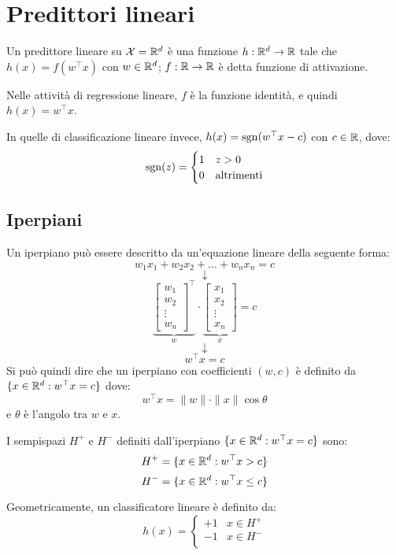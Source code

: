 \section{Predittori lineari}
Un predittore lineare su $\mathcal{X}=\mathbb{R}^d$ è una funzione $h:\mathbb{R}^d\rightarrow\mathbb{R}$
tale che $h(x)=f(w^\top x)$ con $w\in\mathbb{R}^d$; $f:\mathbb{R}\rightarrow\mathbb{R}$ è
detta funzione di attivazione. 

Nelle attività di regressione lineare, $f$ è la funzione identità, e quindi
$h(x)=w^\top x$.

In quelle di classificazione lineare invece, $h(x)=\operatorname*{sgn}(w^\top x-c)$ con
$c\in\mathbb{R}$, dove:
$$ \operatorname*{sgn}(z) = \begin{cases}1&z>0\\0&\text{altrimenti}\end{cases} $$

\subsection{Iperpiani}
Un iperpiano può essere descritto da un'equazione lineare della seguente
forma:
$$ w_1x_1+w_2x_2+\dots+w_nx_n=c $$
$$ \downarrow $$
$$ \underbrace{\begin{bmatrix}w_1\\w_2\\\vdots\\w_n\end{bmatrix}^\top}
      _{\displaystyle w}\cdot
   \underbrace{\begin{bmatrix}x_1\\x_2\\\vdots\\x_n\end{bmatrix}}
      _{\displaystyle x}=c
$$
$$ \downarrow $$
$$ w^\top x = c $$
Si può quindi dire che un iperpiano con coefficienti $(w,c)$ è definito da
$\{x\in\mathbb{R}^d:w^\top x=c\}$ dove:
\begin{equation}
   w^\top x = \|w\|\cdot\|x\|\cos\theta\label{eq:hyperplane_eq}
\end{equation}
e $\theta$ è l'angolo tra $w$ e $x$.

I sempispazi $H^+$ e $H^-$ definiti dall'iperpiano $\{x\in\mathbb{R}^d:w^\top x=c\}$
sono:
$$ H^+=\{x\in\mathbb{R}^d:w^\top x>c\} $$
$$ H^-=\{x\in\mathbb{R}^d:w^\top x\leq c\} $$

Geometricamente, un classificatore lineare è definito da:
$$ h(x) = \begin{cases}
+1 & x\in H^+\\
-1 & x\in H^-\\
\end{cases} $$

